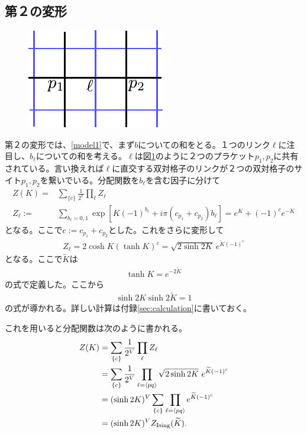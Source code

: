\documentclass[a4paper,12pt,dvipdfmx]{jlreq}
\newcommand{\Kt}{\widetilde{K}}
\newcommand{\ZIs}{Z_{\mathrm{Ising}}}
\begin{document}
\subsection{第２の変形}

\begin{figure}
  \centering
  \includegraphics{link_plaquette.pdf}
  \caption{{}}
  \label{fig:link_plaquette}
\end{figure}

第２の変形では、\eqref{model1}で、まず$b$についての和をとる。１つのリンク$\ell$に注目し、$b_{\ell}$についての和を考える。$\ell$は図\ref{fig:link_plaquette}のように２つのプラケット$p_1,p_2$に共有されている。言い換えれば$\ell$に直交する双対格子のリンクが２つの双対格子のサイト$p_1,p_2$を繋いでいる。分配関数を$b_{\ell}$を含む因子に分けて
\begin{align}
  Z(K)=&\sum_{\{c\}}\frac{1}{2^V}\prod_{\ell}Z_{\ell}\\
  Z_{\ell}:=&\sum_{b_{\ell}=0,1}\exp\left[
    K(-1)^{b_{\ell}}+i\pi (c_{p_1}+c_{p_2})b_{\ell}
  \right]
  =e^{K}+(-1)^{c}e^{-K}
\end{align}
となる。ここで$c:=c_{p_1}+c_{p_2}$とした。これをさらに変形して
\begin{align}
  Z_{\ell}=2\cosh K (\tanh K)^{c}
  =\sqrt{2\sinh 2K}\ e^{\Kt(-1)^c}\label{Zelltemp}
\end{align}
となる。ここで$\Kt$は
\begin{align}
  \tanh K = e^{-2\Kt}
\end{align}
の式で定義した。ここから
\begin{align}
  \sinh 2 K \sinh 2\Kt =1 \label{dualK}
\end{align}
の式が導かれる。詳しい計算は付録\ref{sec:calculation}に書いておく。

これを用いると分配関数は次のように書かれる。
\begin{align}
  Z(K)&=\sum_{\{c\}}\frac{1}{2^V}\prod_{\ell}Z_{\ell}\notag\\
  &=\sum_{\{c\}}\frac{1}{2^V}\prod_{\ell=\expval{pq}}\sqrt{2\sinh 2K}\ e^{\Kt(-1)^c}\notag\\
  &=(\sinh 2K)^{V}\sum_{\{c\}}\prod_{\ell=\expval{pq}} e^{\Kt(-1)^c}\notag\\
  &=(\sinh 2K)^{V}\ZIs(\Kt).
\end{align}
\end{document}
